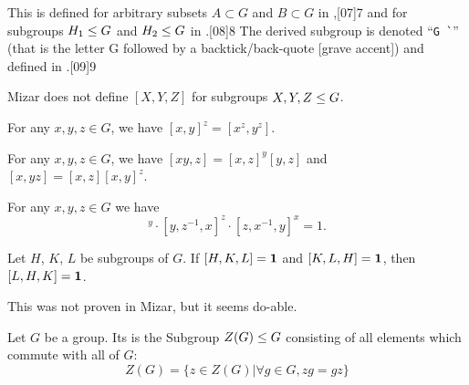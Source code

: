 \begin{def-remark}
This is defined for arbitrary subsets $A\subset G$ and $B\subset G$ in
,[07]{7} and for subgroups $H_{1}\leq G$ and
$H_{2}\leq G$ in .[08]{8} The derived subgroup is
denoted ``\lstinline{G `}'' (that is the letter G followed by a
backtick/back-quote [grave accent]) and defined in .[09]{9}
\end{def-remark}

\begin{def-remark}
  Mizar does not define $[X,Y,Z]$ for subgroups $X,Y,Z\leq G$.
\end{def-remark}

\begin{theorem}
For any $x,y,z\in G$, we have $[x,y]^{z} = [x^{z},y^{z}]$.
\end{theorem}

\begin{theorem}
  For any $x,y,z\in G$, we have $[xy,z] = [x,z]^{y}[y,z]$ and
  $[x,yz] = [x,z] [x,y]^{z}$.
\end{theorem}

\begin{theorem}
  For any $x,y,z\in G$ we have
  \begin{equation}
    [x, y^{-1}, z]^y\cdot[y, z^{-1}, x]^z\cdot[z, x^{-1}, y]^x = 1.
  \end{equation}
\end{theorem}

\begin{theorem}
  Let $H$, $K$, $L$ be subgroups of $G$.
  If $[H,K,L]=\mathbf{1}$ and $[K,L,H]=\mathbf{1}$,
  then $[L,H,K]=\mathbf{1}$.
\end{theorem}

This was not proven in Mizar, but it seems do-able.


\begin{definition}
Let $G$ be a group. Its  is the Subgroup $Z(G)\leq G$
consisting of all elements which commute with all of $G$:
\begin{equation*}
Z(G) = \{z\in Z(G) | \forall g\in G, zg=gz\}
\end{equation*}
\end{definition}
